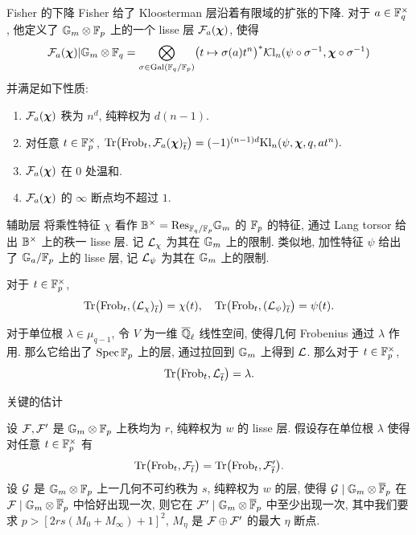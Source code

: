 \documentclass[aspectratio=169,handout]{ctexbeamer}
\newcommand\bchi{{\boldsymbol\chi}}
\begin{document}
\begin{frame}{Fisher 的下降}
Fisher 给了 Kloosterman 层沿着有限域的扩张的下降.
对于 $a\in{\mathbb{F}}_q^\times$, 他定义了 $\mathbb{G}_m\otimes{\mathbb{F}}_p$ 上的一个 lisse 层 $\CF_a(\bchi)$, 使得
\[\CF_a(\bchi)|\Gm\otimes\BF_q=\bigotimes\limits_{\sigma\in\Gal(\BF_q/\BF_p)} \bigl(t\mapsto \sigma(a)t^n\bigr)^*\CKl_n(\psi\circ\sigma^{-1},\bchi\circ\sigma^{-1})\]
并满足如下性质:
\begin{enumerate}
\item $\CF_a(\bchi)$ 秩为 $n^d$, 纯粹权为 $d(n-1)$.
\item 对任意 $t\in{\mathbb{F}}_p^\times$,
	$\Tr\bigl(\Frob_t,\CF_a(\bchi)_{\ov t}\bigr)=(-1)^{(n-1)d}\Kl_n(\psi,\bchi,q,at^n).$
\item $\CF_a(\bchi)$ 在 $0$ 处温和.
\item $\CF_a(\bchi)$ 的 $\infty$ 断点均不超过 $1$.
\end{enumerate}
\end{frame}



\begin{frame}{辅助层}
将乘性特征 $\chi$ 看作 ${\mathbb{B}}^\times={\mathrm{Res}}_{{\mathbb{F}}_q/{\mathbb{F}}_p}\mathbb{G}_m$ 的 ${\mathbb{F}}_p$ 的特征, 通过 Lang torsor 给出 ${\mathbb{B}}^\times$ 上的秩一 lisse 层. 记 ${\mathcal{L}}_\chi$ 为其在 $\mathbb{G}_m$ 上的限制.
类似地, 加性特征 $\psi$ 给出了 $\mathbb{G}_a/{\mathbb{F}}_p$ 上的 lisse 层, 记 ${\mathcal{L}}_\psi$ 为其在 $\mathbb{G}_m$ 上的限制.

对于 $t\in{\mathbb{F}}_p^\times$,
\[{\mathrm{Tr}}\bigl({\mathrm{Frob}}_t, ({\mathcal{L}}_\chi)_{\overline t}\bigr)=\chi(t),\quad
{\mathrm{Tr}}\bigl({\mathrm{Frob}}_t, ({\mathcal{L}}_\psi)_{\overline t}\bigr)=\psi(t).\]

对于单位根 $\lambda\in\mu_{q-1}$, 令 $V$ 为一维 $\overline{{\mathbb{Q}}}_\ell$ 线性空间, 使得几何 Frobenius 通过 $\lambda$ 作用.
那么它给出了 $\operatorname{Spec} {\mathbb{F}}_p$ 上的层, 通过拉回到 $\mathbb{G}_m$ 上得到 ${\mathcal{L}}$.
那么对于 $t\in{\mathbb{F}}_p^\times$,
\[{\mathrm{Tr}}\bigl({\mathrm{Frob}}_t, {\mathcal{L}}_{\overline t}\bigr)=\lambda.\]
\end{frame}

\begin{frame}{关键的估计}
\begin{lemma}
设 ${\mathcal{F}},{\mathcal{F}}'$ 是 $\mathbb{G}_m\otimes{\mathbb{F}}_p$ 上秩均为 $r$, 纯粹权为 $w$ 的 lisse 层.
假设存在单位根 $\lambda$ 使得对任意 $t\in {\mathbb{F}}_p^\times$ 有
	\[{\mathrm{Tr}}\bigl({\mathrm{Frob}}_t, {\mathcal{F}}_{\overline t}\bigr)={\mathrm{Tr}}\bigl({\mathrm{Frob}}_t, {\mathcal{F}}'_{\overline t}\bigr).\]
设 ${\mathcal{G}}$ 是 $\mathbb{G}_m\otimes{\mathbb{F}}_p$ 上一几何不可约秩为 $s$, 纯粹权为 $w$ 的层, 使得 ${\mathcal{G}}\mid \mathbb{G}_m\otimes\overline{{\mathbb{F}}}_p$ 在 ${\mathcal{F}}\mid \mathbb{G}_m\otimes\overline {{\mathbb{F}}}_p$ 中恰好出现一次, 则它在 ${\mathcal{F}}'\mid \mathbb{G}_m\otimes\overline {{\mathbb{F}}}_p$ 中至少出现一次, 其中我们要求 $p>[2rs(M_0+M_\infty)+1]^2$, $M_\eta$ 是 ${\mathcal{F}}\oplus {\mathcal{F}}'$ 的最大 $\eta$ 断点.
\end{lemma}
\end{frame}
\end{document}
